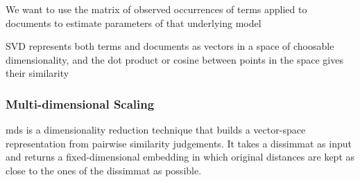 We want to use the matrix of observed occurrences of terms applied to documents to estimate parameters of that underlying model

SVD represents both terms and documents as vectors in a space of choosable dimensionality, and the dot product or cosine between points in the space gives their similarity

\subsubsection*{Multi-dimensional Scaling}

\Gls{mds} is a dimensionality reduction technique that builds a vector-space representation from pairwise similarity judgements. It takes a \gls{dissimmat} as input and returns a fixed-dimensional embedding in which original distances are kept as close to the ones of the \gls{dissimmat} as possible. 
 



